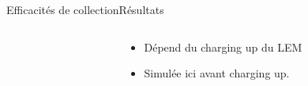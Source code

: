 \begin{frame}{Efficacités de collection}{Résultats}
\begin{columns}
\begin{column}{0.5\textwidth}
\begin{scriptsize}
                \end{scriptsize}
            \end{column}\hfill
            \begin{column}{0.5\textwidth}
              \begin{scriptsize}
                \begin{itemize}
                    \item Dépend du charging up du LEM
                    \item Simulée ici avant charging up.
                \end{itemize}
              \end{scriptsize}
            \end{column}
        \end{columns}
    \end{frame}
    
